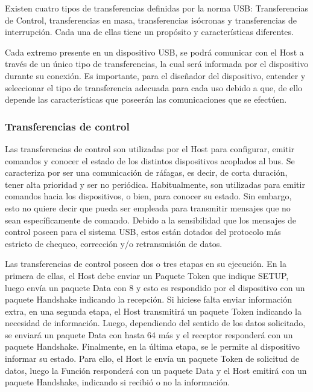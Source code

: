 Existen cuatro tipos de transferencias definidas por la norma USB: Transferencias de Control, transferencias en masa, transferencias isócronas y transferencias de interrupción. Cada una de ellas tiene un propósito y características diferentes.

Cada extremo presente en un dispositivo USB, se podrá comunicar con el Host a través de un único tipo de transferencias, la cual será informada por el dispositivo durante su conexión. Es importante, para el diseñador del dispositivo, entender y seleccionar el tipo de transferencia adecuada para cada uso debido a que, de ello depende las características que poseerán las comunicaciones que se efectúen.

\subsubsection{Transferencias de control}
	
	Las transferencias de control son utilizadas por el Host para configurar, emitir comandos y conocer el estado de los distintos dispositivos acoplados al bus. Se caracteriza por ser una comunicación de ráfagas, es decir, de corta duración, tener alta prioridad y ser no periódica. Habitualmente, son utilizadas para emitir comandos hacia los dispositivos, o bien, para conocer su estado. Sin embargo, esto no quiere decir que pueda ser empleada para transmitir mensajes que no sean específicamente de comando. Debido a la sensibilidad que los mensajes de control poseen para el sistema USB, estos están dotados del protocolo más estricto de chequeo, corrección y/o retransmisión de datos.%
	
	Las transferencias de control poseen dos o tres etapas en su ejecución. En la primera de ellas, el Host debe enviar un Paquete Token que indique SETUP, luego envía un paquete Data con \SI{8}{\byte} y esto es respondido por el dispositivo con un paquete Handshake indicando la recepción. Si hiciese falta enviar información extra, en una segunda etapa, el Host transmitirá un paquete Token indicando la necesidad de información. Luego, dependiendo del sentido de los datos solicitado, se enviará un paquete Data con hasta \SI{64}{\byte} más y el receptor responderá con un paquete Handshake. Finalmente, en la última etapa, se le permite al dispositivo informar su estado. Para ello, el Host le envía un paquete Token de solicitud de datos, luego la Función responderá con un paquete Data y el Host emitirá con un paquete Handshake, indicando si recibió o no la información.
	
